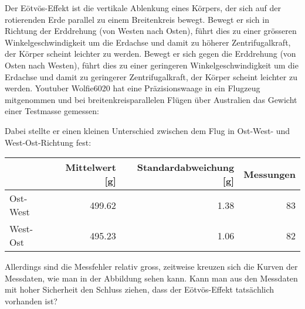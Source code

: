 Der Eötvös-Effekt ist die vertikale Ablenkung eines Körpers, der sich
auf der rotierenden Erde parallel zu einem Breitenkreis bewegt.
Bewegt er sich in Richtung der Erddrehung (von Westen nach Osten),
führt dies zu einer grösseren Winkelgeschwindigkeit um die Erdachse
und damit zu höherer Zentrifugalkraft, der Körper scheint leichter
zu werden.
Bewegt er sich gegen die Erddrehung (von Osten nach Westen), führt
dies zu einer geringeren Winkelgeschwindigkeit um die Erdachse und
damit zu geringerer Zentrifugalkraft, der Körper scheint leichter
zu werden.
Youtuber Wolfie6020 hat eine Präzisionswaage in ein Flugzeug
mitgenommen und bei breitenkreisparallelen Flügen über Australien
das Gewicht einer Testmasse gemessen:
\begin{center}
\end{center}
Dabei stellte er einen kleinen Unterschied zwischen dem Flug in
Ost-West- und West-Ost-Richtung fest:
\begin{center}
\begin{tabular}{|l|rrr|}
\hline
        &Mittelwert [g]&Standardabweichung [g]&Messungen\\
\hline
Ost-West&        499.62&                  1.38&       83\\
West-Ost&        495.23&                  1.06&       82\\
\hline
\end{tabular}
\end{center}
Allerdings sind die Messfehler relativ gross, zeitweise kreuzen sich
die Kurven der Messdaten, wie man in der Abbildung sehen kann.
Kann man aus den Messdaten mit hoher Sicherheit den Schluss ziehen,
dass der Eötvös-Effekt tatsächlich vorhanden ist?

%
%

